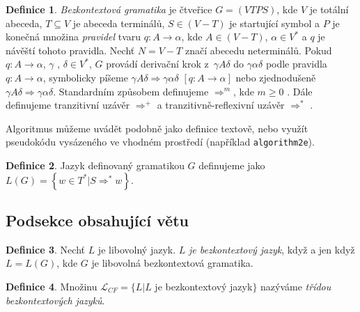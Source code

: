\documentclass[11pt,a4paper,twocolumn]{article}
\theoremstyle{definition}
\newtheorem{defn}{Definice}[section]
\newtheorem{algo}[defn]{Algoritmus}
\begin{document}
\begin{defn}\label{def:1}\textit{Bezkontextová gramatika} je čtveřice $G = (VTPS)$, kde $V$ je totální abeceda,
    $T \subseteq V$ je abe\-ceda terminálů, $S \in (V - T)$ je startující symbol a $P$ je konečná množina \textit{pravidel}
    tvaru $q: A \rightarrow \alpha$, kde $A \in (V-T)$, $\alpha \in V^*$ a $q$ je návěští tohoto pravidla. Nechť $N = V -T$ značí abecedu neterminálů.
Pokud $q: A \rightarrow \alpha$, $\gamma$ , $\delta \in V^*$, $G$ provádí derivační krok z~$\gamma A \delta$ do $\gamma \alpha \delta$ podle pravidla $q: A \rightarrow \alpha$, symbolicky píšeme 
$\gamma A \delta \Rightarrow \gamma \alpha \delta$ $[q: A \rightarrow \alpha]$ nebo zjednodušeně $\gamma A \delta \Rightarrow \gamma \alpha \delta$. Standardním způsobem definujeme $\Rightarrow ^m$, kde $m \geq 0$ . Dále definujeme 
tranzitivní uzávěr $\Rightarrow ^+$ a tranzitivně-reflexivní uzávěr $\Rightarrow ^*$ .
\end{defn}
Algoritmus můžeme uvádět podobně jako definice textově, nebo využít pseudokódu vysázeného ve vhodném prostředí (například \texttt{algorithm2e}).

\begin{defn}Jazyk definovaný gramatikou $G$ definujeme jako $L(G) = \left\{ w \in T^*|S \Rightarrow ^* w \right\}$.\end{defn}

\subsection{Podsekce obsahující větu}

\begin{defn}Nechť $L$ je libovolný jazyk. $L$ \textit{je bezkontextový jazyk}, když a jen když $L = L(G)$, kde $G$ je libovolná bezkontextová gramatika.\end{defn}

\begin{defn}Množinu $\mathcal{L} _{CF} = \{L|L$ je bezkontextový jazyk$\}$ nazýváme \textit{třídou bezkontextových jazyků}.\end{defn}
\end{document}
